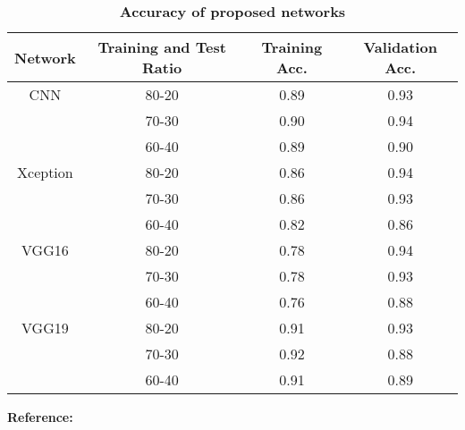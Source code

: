 \begin{table}[h]
	\centering
	\caption\textbf{Accuracy of proposed networks}
	\label{tab:Accuracy}
	\begin{tabular}{|c|c|c|c|}
		\hline
		Network & Training and Test Ratio & Training Acc. & Validation Acc. \\
		\hline
		CNN & 80-20 & 0.89 & 0.93 \\
		\cline{2-4}
		& 70-30 & 0.90 & 0.94 \\
		\cline{2-4}
		& 60-40 & 0.89 & 0.90 \\
		\hline
		Xception & 80-20 & 0.86 & 0.94 \\
		\cline{2-4}
		& 70-30 & 0.86 & 0.93 \\
		\cline{2-4}
		& 60-40 & 0.82 & 0.86 \\
		\hline
		VGG16 & 80-20 & 0.78 & 0.94 \\
		\cline{2-4}
		& 70-30 & 0.78 & 0.93 \\
		\cline{2-4}
		& 60-40 & 0.76 & 0.88 \\
		\hline
		VGG19 & 80-20 & 0.91 & 0.93 \\
		\cline{2-4}
		& 70-30 & 0.92 & 0.88 \\
		\cline{2-4}
		& 60-40 & 0.91 & 0.89 \\
		\hline
	\end{tabular}
	\footnotesize \textbf{Reference:}\cite{jain2022deep}
\end{table}
